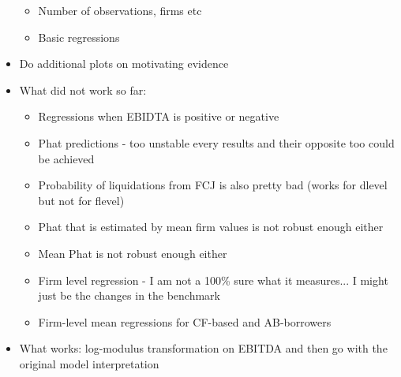 \documentclass[12pt]{article}
\begin{document}
\begin{itemize}
\begin{itemize}
            \item Number of observations, firms etc \checkmark
            \item Basic regressions \checkmark
        \end{itemize}
    \item Do additional plots on motivating evidence \checkmark
    \item What did not work so far: \checkmark
        \begin{itemize} \setlength\itemsep{0em}
            \item Regressions when EBIDTA is positive or negative
            \item Phat predictions - too unstable every results and their opposite too could be achieved
            \item Probability of liquidations from FCJ is also pretty bad (works for dlevel but not for flevel)
            \item Phat that is estimated by mean firm values is not robust enough either
            \item Mean Phat is not robust enough either
            \item Firm level regression - I am not a 100\% sure what it measures... I might just be the changes in the benchmark
            \item Firm-level mean regressions for CF-based and AB-borrowers
        \end{itemize}
    \item What works: log-modulus transformation on EBITDA and then go with the original model interpretation \checkmark
    \end{itemize} \normalsize


\newpage
\end{document}
